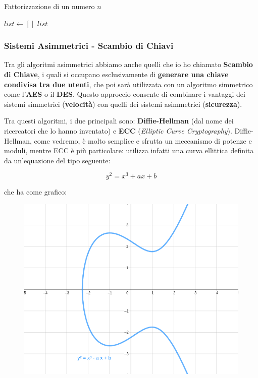 \documentclass{report}
\begin{document}
\vspace{0.5cm}


\begin{algorithm}[H]
\caption{Fattorizzazione di un numero $n$}
$list \gets []$\;
\Return $list$\;
\end{algorithm}


\newpage

\subsubsection{Sistemi Asimmetrici - Scambio di Chiavi}
Tra gli algoritmi asimmetrici abbiamo anche quelli che io ho chiamato \textbf{Scambio di Chiave}, i quali si occupano esclusivamente di \textbf{generare una chiave condivisa tra due utenti}, che poi sarà utilizzata con un algoritmo simmetrico come l'\textbf{AES} o il \textbf{DES}. Questo approccio consente di combinare i vantaggi dei sistemi simmetrici (\textbf{velocità}) con quelli dei sistemi asimmetrici (\textbf{sicurezza}).


Tra questi algoritmi, i due principali sono: \textbf{Diffie-Hellman} (dal nome dei ricercatori che lo hanno inventato) e \textbf{ECC} (\textit{Elliptic Curve Cryptography}). Diffie-Hellman, come vedremo, è molto semplice e sfrutta un meccanismo di potenze e moduli, mentre ECC è più particolare: utilizza infatti una curva ellittica definita da un’equazione del tipo seguente:


\begin{equation*}
    y^2 = x^3 + ax + b    
\end{equation*}

che ha come grafico:

\begin{figure}[h]
    \centering
    \includegraphics[width=0.6\linewidth]{logos/Screenshot from 2025-09-01 18-49-58.png}
\end{figure}
\end{document}
